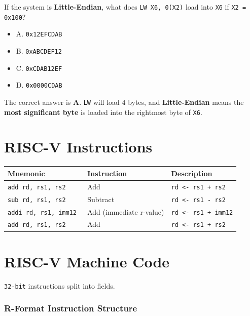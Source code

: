 \documentclass[12pt, letterpaper]{article}
\begin{document}
If the system is \textbf{Little-Endian}, what does \texttt{LW X6,
0(X2)} load into \texttt{X6} if \texttt{X2 = 0x100}?

\begin{itemize}
  \item A. \texttt{0x12EFCDAB}
  \item B. \texttt{0xABCDEF12}
  \item C. \texttt{0xCDAB12EF}
  \item D. \texttt{0x0000CDAB}
\end{itemize}

The correct answer is \textbf{A}. \texttt{LW} will load 4 bytes, and
\textbf{Little-Endian} means  the \textbf{most significant byte} is
loaded into the rightmost byte of \texttt{X6}.

\part*{RISC-V Instructions}

\begin{table}[h]
  \begin{center}
    \begin{tabular}{|p{4cm}|p{6cm}|p{5cm}| }
      \hline
      \textbf{Mnemonic} & \textbf{Instruction} & \textbf{Description} \\
      \hline
      \texttt{add rd, rs1, rs2 } & Add & \texttt{rd <- rs1 + rs2}\\
      \hline
      \texttt{sub rd, rs1, rs2 } & Subtract & \texttt{rd <- rs1 - rs2}\\
      \hline
      \texttt{addi rd, rs1, imm12 } & Add (immediate r-value) &
      \texttt{rd <- rs1 + imm12}\\
      \hline
      \texttt{add rd, rs1, rs2 } & Add & \texttt{rd <- rs1 + rs2}\\
      \hline
    \end{tabular}
  \end{center}
\end{table}

\FloatBarrier

\part*{RISC-V Machine Code}

\texttt{32-bit} instructions split into fields.

\section*{R-Format Instruction Structure}
\end{document}
